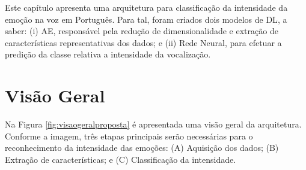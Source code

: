 


Este capítulo apresenta uma arquitetura para classificação da intensidade da emoção na voz em Português. Para tal, foram criados dois modelos de \acrlong{DL}, a saber: (i) \acrlong{AE}, responsável pela redução de dimensionalidade e extração de características representativas dos dados; e (ii) Rede Neural, para efetuar a predição da classe relativa a intensidade da vocalização.\\


\section{Visão Geral}

Na Figura \ref{fig:visaogeralproposta} é apresentada uma visão geral da arquitetura. Conforme a imagem, três etapas principais serão necessárias para o reconhecimento da intensidade das emoções: (A) Aquisição dos dados; (B) Extração de características; e (C) Classificação da intensidade.

